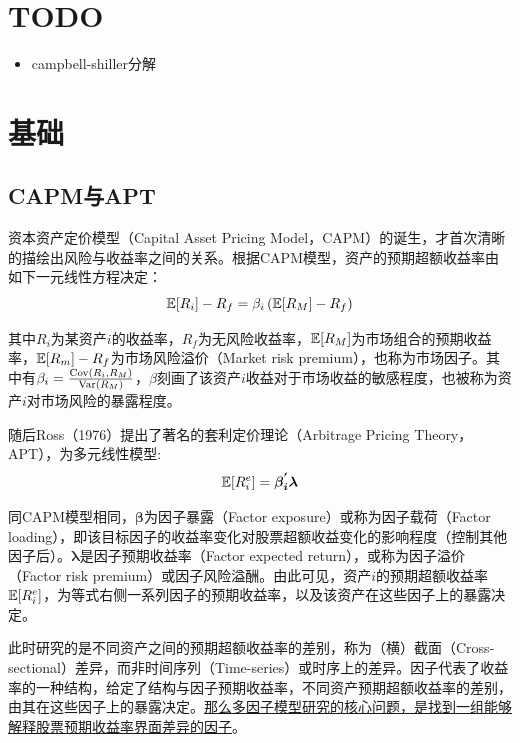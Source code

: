 \documentclass[11pt]{article}
\begin{document}
\maketitle
\tableofcontents

\section{TODO}
\begin{itemize}
    \item campbell-shiller分解
\end{itemize}

\section{基础}

\subsection{CAPM与APT}

资本资产定价模型（Capital Asset Pricing Model，CAPM）的诞生，才首次清晰的描绘出风险与收益率之间的关系。根据CAPM模型，资产的预期超额收益率由如下一元线性方程决定：
\begin{equation*}
    \mathbb{E}[R_i] - R_f = \beta_i \left( \mathbb{E}[R_M]-R_f \right)
\end{equation*}

其中$R_i$为某资产$i$的收益率，$R_f$为无风险收益率，$\mathbb{E}[R_M]$为市场组合的预期收益率，$\mathbb{E}[R_m]- R_f$为市场风险溢价（Market risk premium），也称为市场因子。其中有$\beta_i = \frac{\operatorname{Cov}(R_i,R_M)}{\operatorname{Var}(R_M)}$，$\beta$刻画了该资产$i$收益对于市场收益的敏感程度，也被称为资产$i$对市场风险的暴露程度。

随后Ross（1976）提出了著名的套利定价理论（Arbitrage Pricing Theory，APT），为多元线性模型:
\begin{equation*}
    \mathbb{E}[R_i^e] = \bm{\beta_{i}^{'} \lambda}
\end{equation*}

同CAPM模型相同，$\bm{\beta}$为因子暴露（Factor exposure）或称为因子载荷（Factor loading），即该目标因子的收益率变化对股票超额收益变化的影响程度（控制其他因子后）。$\bm{\lambda}$是因子预期收益率（Factor expected return），或称为因子溢价（Factor risk premium）或因子风险溢酬。由此可见，资产$i$的预期超额收益率$\mathbb{E}[R_i^e]$，为等式右侧一系列因子的预期收益率，以及该资产在这些因子上的暴露决定。

此时研究的是不同资产之间的预期超额收益率的差别，称为（横）截面（Cross-sectional）差异，而非时间序列（Time-series）或时序上的差异。因子代表了收益率的一种结构，给定了结构与因子预期收益率，不同资产预期超额收益率的差别，由其在这些因子上的暴露决定。\uline{那么多因子模型研究的核心问题，是找到一组能够解释股票预期收益率界面差异的因子}。
\end{document}

